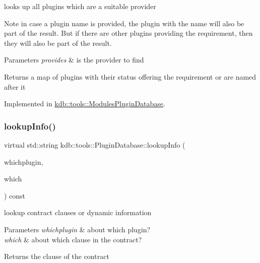 looks up all plugins which are a suitable provider 

\begin{DoxyNote}{Note}
in case a plugin name is provided, the plugin with the name will also be part of the result. But if there are other plugins providing the requirement, then they will also be part of the result.
\end{DoxyNote}

\begin{DoxyParams}{Parameters}
{\em provides} & is the provider to find\\
\hline
\end{DoxyParams}
\begin{DoxyReturn}{Returns}
a map of plugins with their status offering the requirement or are named after it 
\end{DoxyReturn}


Implemented in \hyperlink{classkdb_1_1tools_1_1ModulesPluginDatabase_abe19487ff2a2e0548288dfa2a5678ae1}{kdb\+::tools\+::\+Modules\+Plugin\+Database}.

\mbox{\label{classkdb_1_1tools_1_1PluginDatabase_ac0af2ec31a98f4176c19eaf34977abbe}} 
\subsubsection{\texorpdfstring{lookup\+Info()}{lookupInfo()}}
{\footnotesize\ttfamily virtual std\+::string kdb\+::tools\+::\+Plugin\+Database\+::lookup\+Info (\begin{DoxyParamCaption}\item[{\hyperlink{classkdb_1_1tools_1_1PluginSpec}{Plugin\+Spec} const \&}]{whichplugin,  }\item[{std\+::string const \&}]{which }\end{DoxyParamCaption}) const\hspace{0.3cm}{\ttfamily [pure virtual]}}



lookup contract clauses or dynamic information 


\begin{DoxyParams}{Parameters}
{\em whichplugin} & about which plugin? \\
\hline
{\em which} & about which clause in the contract?\\
\hline
\end{DoxyParams}
\begin{DoxyReturn}{Returns}
the clause of the contract 
\end{DoxyReturn}



